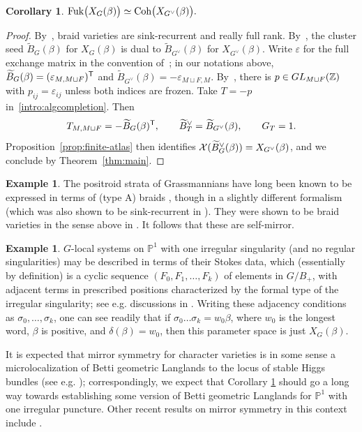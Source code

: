 \documentclass[12pt, letter]{amsart}
\DeclareMathOperator{\Fuk}{Fuk}
\newtheorem{corollary}[dummy]{Corollary}
\theoremstyle{definition}
\newtheorem{example}[dummy]{Example}
\begin{document}
\begin{corollary}\label{cor:braid}
$\Fuk\bigl(X_G(\beta)\bigr)\simeq \Coh\bigl(X_{G^\vee}(\beta)\bigr).$
\end{corollary}

\begin{proof}
By~\cite[Sections~4.8--4.9 and~6.3]{GLSB}, braid varieties are sink-recurrent and really full rank.
By~\cite[Proposition~6.14]{CGGLSS}, the cluster seed $\widetilde B_G(\beta)$ for $X_G(\beta)$ is dual to $\widetilde B_{G^\vee}(\beta)$ for $X_{G^\vee}(\beta)$.
Write $\varepsilon$ for the full exchange matrix in the convention of~\cite{CGGLSS}; in our notations above, 
$
 \widetilde B_G(\beta)=(\varepsilon_{M,M\sqcup F})^{\mathsf T}$ and $\widetilde B_{G^\vee}(\beta)=-\varepsilon_{M\sqcup F,M}$.
By~\cite[Equation~(45), Lemmas~8.2 and~8.4]{CGGLSS}, there is $p\in GL_{M\sqcup F}(\mathbb{Z})$ with $p_{ij}=\varepsilon_{ij}$ unless both indices are frozen.
Take $T=-p$ in~\eqref{intro:algcompletion}. Then 
\[
 T_{M,M\sqcup F}=-\widetilde B_G(\beta)^{\mathsf T},\qquad
 \widetilde B_T^\vee=\widetilde B_{G^\vee}(\beta),\qquad G_T=1.
\]
Proposition~\ref{prop:finite-atlas} then identifies $\mathcal{X}(\widetilde B_G^\vee(\beta)) = X_{G^\vee}(\beta)$, and we conclude by  Theorem~\ref{thm:main}.
\end{proof}


\begin{example}
    The positroid strata of  Grassmannians have long been known to be expressed in terms of (type A) braids \cite{KLS}, though in a slightly different formalism (which was also shown to be sink-recurrent in \cite{GLSB}).  They were shown to be braid varieties in the sense above in \cite{CGGS}.  It follows that these are self-mirror. 
\end{example}

\begin{example}
$G$-local systems on $\mathbb{P}^1$ with one irregular singularity (and no regular singularities) may be described in terms of their Stokes data, which (essentially by definition) is a cyclic sequence $(F_0, F_1, \ldots, F_k)$ of elements in $G/B_+$, with adjacent terms in prescribed positions characterized by the formal type of the irregular singularity; see e.g. discussions in \cite{boalch-yamakawa}.  Writing these adjacency conditions as $\sigma_0, \ldots, \sigma_k$, one can see readily that if $\sigma_0 \ldots \sigma_k = w_0 \beta$, where $w_0$ is the longest word, $\beta$ is positive, and $\delta(\beta) = w_0$, then this parameter space is just $X_G(\beta)$.  

It is expected that mirror symmetry for character varieties is in some sense a microlocalization of Betti geometric Langlands \cite{benzvi-nadler} to the locus of stable Higgs bundles (see e.g. \cite{shende-hitchinfibers, nadler-shende-higgs}); correspondingly, we expect that Corollary \ref{cor:braid} should go a long way towards establishing some version of Betti geometric Langlands  for $\mathbb{P}^1$ with one irregular puncture.  Other recent results on mirror symmetry in this context include \cite{jin-yun, BHOS}. 
\end{example}
\end{document}
